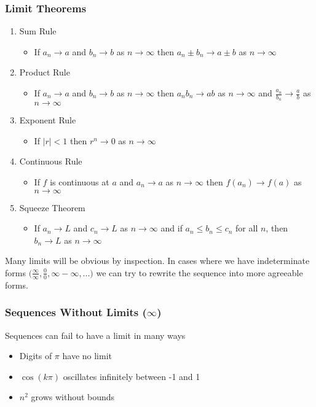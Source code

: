 \documentclass[12pt]{article}
\begin{document}
\subsubsection*{Limit Theorems}
\begin{enumerate}
\item Sum Rule
\begin{itemize}
\item If $a_n \to a$ and $b_n \to b$ as $n\to\infty$ then $a_n \pm b_n \to a \pm b$ as $n\to\infty$
\end{itemize}
\item Product Rule
\begin{itemize}
\item If $a_n \to a$ and $b_n \to b$ as $n\to\infty$ then $a_nb_n \to ab$ as $n\to\infty$ and $\frac{a_n}{b_n} \to \frac{a}{b}$ as $n\to\infty$
\end{itemize}
\item Exponent Rule
\begin{itemize}
\item If $|r| < 1$ then $r^n \to 0$ as $n\to\infty$
\end{itemize}
\item Continuous Rule
\begin{itemize}
\item If $f$ is continuous at $a$ and $a_n \to a$ as $n\to\infty$ then $f(a_n) \to f(a)$ as $n\to\infty$
\end{itemize}
\item Squeeze Theorem
\begin{itemize}
\item If $a_n \to L$ and $c_n \to L$ as $n\to\infty$ and if $a_n\leq b_n\leq c_n$ for all $n$, then $b_n\to L$ as $n\to\infty$
\end{itemize}
\end{enumerate}

Many limits will be obvious by inspection. In cases where we have indeterminate forms $\big(\frac{\infty}{\infty}, \frac{0}{0}, \infty-\infty,...\big)$ we can try to rewrite the sequence into more agreeable forms.

\subsubsection*{Sequences Without Limits ($\infty$)}
Sequences can fail to have a limit in many ways
\begin{itemize}
\item Digits of $\pi$ have no limit
\item $\cos(k\pi)$ oscillates infinitely between -1 and 1
\item $n^2$ grows without bounds
\end{itemize}
\end{document}

